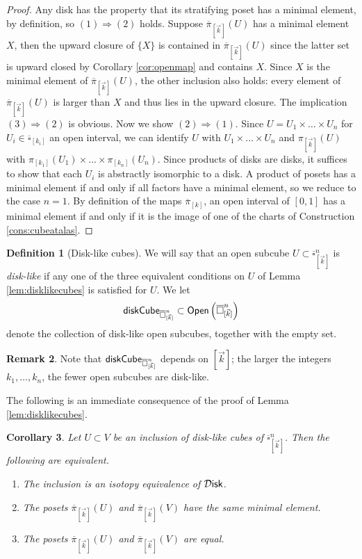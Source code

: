 \documentclass[10pt, reqno, twoside
, final
]{amsart}
\numberwithin{equation}{subsection}%
\theoremstyle{definition}
\newtheorem{defn}{Definition}[subsection]
\theoremstyle{definition}
\theoremstyle{definition}
\theoremstyle{definition}
\theoremstyle{definition}
\theoremstyle{definition}
\theoremstyle{definition}
\theoremstyle{definition}
\theoremstyle{definition}
\theoremstyle{plain}
\theoremstyle{definition}
\theoremstyle{plain}
\theoremstyle{definition}
\theoremstyle{plain}
\newtheorem{cor}[defn]{Corollary}
\theoremstyle{definition}
\newtheorem{rmk}[defn]{Remark}
\theoremstyle{definition}
\theoremstyle{plain}
\theoremstyle{plain}
\theoremstyle{definition}
\theoremstyle{plain}
\theoremstyle{plain}
\theoremstyle{plain}
\begin{document}
\begin{proof}
Any disk has the property that its stratifying poset has a minimal element, by definition, so $(1)\Rightarrow (2)$ holds. Suppose $\overline{\pi}_{[\vec{k}]}(U)$ has a minimal element $X$, then the upward closure of $\{X\}$ is contained in $\overline{\pi}_{[\vec{k}]}(U)$ since the latter set is upward closed by Corollary \ref{cor:openmap} and contains $X$. Since $X$ is the minimal element of $\overline{\pi}_{[\vec{k}]}(U)$, the other inclusion also holds: every element of $\overline{\pi}_{[\vec{k}]}(U)$ is larger than $X$ and thus lies in the upward closure. The implication $(3)\Rightarrow (2)$ is obvious. Now we show $(2)\Rightarrow (1)$. Since $U=U_1\times \ldots \times U_n$ for $U_i\in \overline{\square}_{[k_i]}$ an open interval, we can identify $U$ with $U_1\times \ldots \times U_n$ and $\pi_{[\vec{k}]}(U)$ with $\pi_{[k_1]}(U_1)\times\ldots\times  \pi_{[k_n]}(U_n)$. Since products of disks are disks, it suffices to show that each $U_i$ is abstractly isomorphic to a disk. A product of posets has a minimal element if and only if all factors have a minimal element, so we reduce to the case $n=1$. By definition of the maps $\overline{\pi}_{[k]}$, an open interval of $[0,1]$ has a minimal element if and only if it is the image of one of the charts of Construction \ref{cons:cubeatalas}.
\end{proof}

\begin{defn}[Disk-like cubes]\label{defn:disklikecubes}
We will say that an open subcube $U\subset \overline{\square}_{[\vec{k}]}^n$ is \emph{disk-like} if any one of the three equivalent conditions on $U$ of Lemma \ref{lem:disklikecubes} is satisfied for $U$. We let \[\mathsf{diskCube}_{\overline{\square}^n_{[\vec{k}]}}\subset \mathsf{Open}\left(\overline{\square}^n_{[\vec{k}]}\right)\]
denote the collection of disk-like open subcubes, together with the empty set.
\end{defn}
\begin{rmk}
Note that $\mathsf{diskCube}_{\overline{\square}^n_{[\vec{k}]}}$ depends on $[\vec{k}]$; the larger the integers $k_1,\ldots,k_n$, the fewer open subcubes are disk-like.
\end{rmk}
The following is an immediate consequence of the proof of Lemma \ref{lem:disklikecubes}.
\begin{cor}
Let $U\subset V$ be an inclusion of disk-like cubes of $\overline{\square}^n_{[\vec{k}]}$. Then the following are equivalent.
\begin{enumerate}[$(1)$]
    \item The inclusion is an isotopy equivalence of $\mathcal{D}\mathsf{isk}$.
    \item The posets $\overline{\pi}_{[\vec{k}]}(U)$ and $\overline{\pi}_{[\vec{k}]}(V)$ have the same minimal element.
    \item The posets $\overline{\pi}_{[\vec{k}]}(U)$ and $\overline{\pi}_{[\vec{k}]}(V)$ are equal.
\end{enumerate}
\end{cor}    
\end{document}
